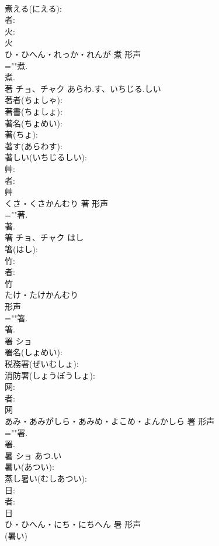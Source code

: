 \documentclass[8pt]{extreport}
\begin{document}
\begin{CJK}{UTF8}{min}
\\	煮える(にえる): 
\\	者: 
\\	火: 
\\	火	
\\	ひ・ひへん・れっか・れんが	煮	形声 
\\	=""煮.
\\	煮.
\\	著	チョ、チャク	あらわ.す、いちじる.しい		
\\	著者(ちょしゃ): 
\\	著書(ちょしょ): 
\\	著名(ちょめい): 
\\	著(ちょ): 
\\	著す(あらわす): 
\\	著しい(いちじるしい): 
\\	艸: 
\\	者: 
\\	艸	
\\	くさ・くさかんむり	著	形声 
\\	=""著.
\\	著.
\\	箸	チョ、チャク	はし		
\\	箸(はし): 
\\	竹: 
\\	者: 
\\	竹	
\\	たけ・たけかんむり	
\\	形声 
\\	=""箸.
\\	箸.
\\	署	ショ			
\\	署名(しょめい): 
\\	税務署(ぜいむしょ): 
\\	消防署(しょうぼうしょ): 
\\	网: 
\\	者: 
\\	网	
\\	あみ・あみがしら・あみめ・よこめ・よんかしら	署	形声 
\\	=""署.
\\	署.
\\	暑	ショ	あつ.い		
\\	暑い(あつい): 
\\	蒸し暑い(むしあつい): 
\\	日: 
\\	者: 
\\	日	
\\	ひ・ひへん・にち・にちへん	暑	形声 
\\	(暑い) 

\end{CJK}
\end{document}
